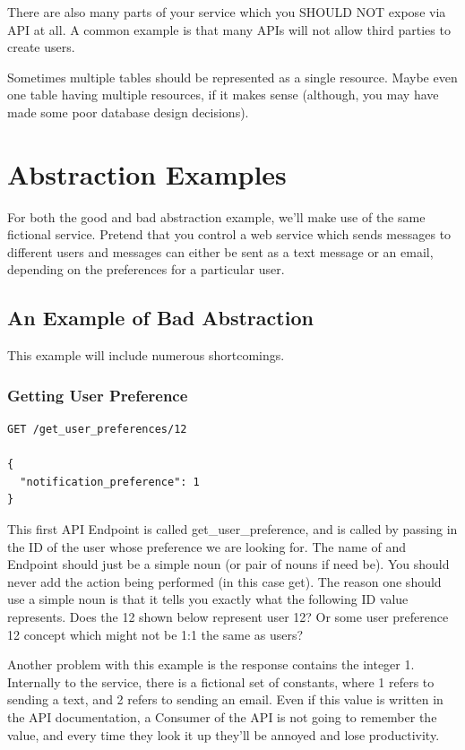 \documentclass{book}
\begin{document}
There are also many parts of your service which you SHOULD NOT expose via API at all. A common example is that many APIs will not allow third parties to create users.

Sometimes multiple tables should be represented as a single resource. Maybe even one table having multiple resources, if it makes sense (although, you may have made some poor database design decisions).

\section {Abstraction Examples}

For both the good and bad abstraction example, we'll make use of the same fictional service. Pretend that you control a web service which sends messages to different users and messages can either be sent as a text message or an email, depending on the preferences for a particular user.

\subsection{An Example of Bad Abstraction}

This example will include numerous shortcomings.

\subsubsection{Getting User Preference}

\begin{verbatim}
GET /get_user_preferences/12

{
  "notification_preference": 1
}
\end{verbatim}

This first API Endpoint is called get\_user\_preference, and is called by passing in the ID of the user whose preference we are looking for. The name of and Endpoint should just be a simple noun (or pair of nouns if need be). You should never add the action being performed (in this case get). The reason one should use a simple noun is that it tells you exactly what the following ID value represents. Does the 12 shown below represent user 12? Or some user preference 12 concept which might not be 1:1 the same as users?

Another problem with this example is the response contains the integer 1. Internally to the service, there is a fictional set of constants, where 1 refers to sending a text, and 2 refers to sending an email. Even if this value is written in the API documentation, a Consumer of the API is not going to remember the value, and every time they look it up they'll be annoyed and lose productivity.
\end{document}
